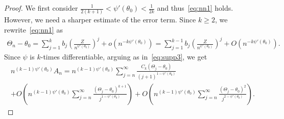 \documentclass[12pt]{amsart}
\theoremstyle{plain}
\theoremstyle{remark}
\numberwithin{equation}{section}
\begin{document}
\begin{proof}


We first consider $\frac{1}{2(k+1)} < \psi'(\theta_0) < \frac{1}{2k}$ and thus~\eqref{eq:nn1} holds. However, we need a sharper estimate of the error term. Since $k\ge 2$, we rewrite~\eqref{eq:nn1} as
\begin{align}\label{eq:nn1 O}
    \Theta_n - \theta_0 = \sum_{j = 1}^{k} b_j \left(\frac{Z}{n^{\psi'(\theta_0)}}\right)^j + o\left(n^{-{k}\psi'(\theta_0)}\right) = \sum_{j = 1}^{k-1} b_j \left(\frac{Z}{n^{\psi'(\theta_0)}}\right)^j + O\left(n^{-{k}\psi'(\theta_0)}\right).
\end{align}
Since $\psi$ is $k$-times differentiable, arguing as in~\eqref{eq:supp3}, we get
\begin{multline} \label{eq:supp2 new}
    n^{(k-1) \psi'(\theta_0)}A_n =  n^{(k-1) \psi'(\theta_0)} \sum_{j=n}^{\infty} \frac{C_{k}(\Theta_j - \theta_0)}{{(j+1)}^{1-\psi'(\theta_0)}} \\ 
    + O\left(n^{(k-1) \psi'(\theta_0)} \sum_{j=n}^{\infty}\frac{(\Theta_j - \theta_0)^{k+1}}{{j}^{1-\psi'(\theta_0)}}\right) + O\left(n^{(k-1) \psi'(\theta_0)} \sum_{j=n}^{\infty}\frac{(\Theta_j - \theta_0)^{2}}{{j}^{2-\psi'(\theta_0)}}\right).
\end{multline}


\end{proof}
\end{document}
